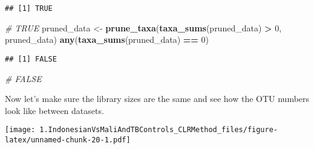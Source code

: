 \documentclass[]{article}
\newenvironment{Shaded}{\begin{snugshade}}{\end{snugshade}}
\newcommand{\CommentTok}[1]{\textcolor[rgb]{0.56,0.35,0.01}{\textit{#1}}}
\newcommand{\DataTypeTok}[1]{\textcolor[rgb]{0.13,0.29,0.53}{#1}}
\newcommand{\DecValTok}[1]{\textcolor[rgb]{0.00,0.00,0.81}{#1}}
\newcommand{\KeywordTok}[1]{\textcolor[rgb]{0.13,0.29,0.53}{\textbf{#1}}}
\newcommand{\NormalTok}[1]{#1}
\newcommand{\OperatorTok}[1]{\textcolor[rgb]{0.81,0.36,0.00}{\textbf{#1}}}
\newcommand{\StringTok}[1]{\textcolor[rgb]{0.31,0.60,0.02}{#1}}
\begin{document}
\begin{verbatim}
## [1] TRUE
\end{verbatim}

\begin{Shaded}
\begin{Highlighting}[]
\CommentTok{# TRUE}
\NormalTok{pruned_data <-}\StringTok{ }\KeywordTok{prune_taxa}\NormalTok{(}\KeywordTok{taxa_sums}\NormalTok{(pruned_data) }\OperatorTok{>}\StringTok{ }\DecValTok{0}\NormalTok{, pruned_data)}
\KeywordTok{any}\NormalTok{(}\KeywordTok{taxa_sums}\NormalTok{(pruned_data) }\OperatorTok{==}\StringTok{ }\DecValTok{0}\NormalTok{)}
\end{Highlighting}
\end{Shaded}

\begin{verbatim}
## [1] FALSE
\end{verbatim}

\begin{Shaded}
\begin{Highlighting}[]
\CommentTok{# FALSE}
\end{Highlighting}
\end{Shaded}

Now let's make sure the library sizes are the same and see how the OTU
numbers look like between datasets.

\begin{Shaded}
\end{Shaded}

\texttt{[image: 1.IndonesianVsMaliAndTBControls\_CLRMethod\_files/figure-latex/unnamed-chunk-20-1.pdf]}
\end{document}
